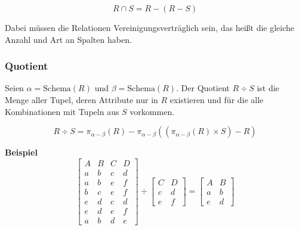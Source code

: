 \documentclass[a4paper, 11pt, accentcolor = tud3b]{tudreport}
\newcommand{\Schema}{\text{Schema}}
\begin{document}
                    \begin{equation*}
	                    R \cap S = R - (R - S)
                    \end{equation*}
                    
                    Dabei müssen die Relationen Vereinigungsverträglich sein, das heißt die gleiche Anzahl und Art an Spalten haben.

                \subsubsection{Quotient} %
                    Seien \( \alpha = \Schema(R) \) und \( \beta = \Schema(R) \). Der Quotient \( R \div S \) ist die Menge aller Tupel, deren Attribute nur in \(R\) existieren und für die alle Kombinationen mit Tupeln aus \(S\) vorkommen.
                    
                    \begin{equation*}
	                    R \div S = \pi_{\alpha - \beta}(R) - \pi_{\alpha - \beta}((\pi_{\alpha-\beta}(R) \times S) - R)
                    \end{equation*}
                    
                    \textbf{Beispiel}
                   	\begin{equation*}
                    	\begin{bmatrix}
	                    	A & B & C & D \\ \hline
	                    	a & b & c & d \\
	                    	a & b & e & f \\
	                    	b & c & e & f \\
	                    	e & d & c & d \\
	                    	e & d & e & f \\
	                    	a & b & d & e
                    	\end{bmatrix}
                    	\div
                    	\begin{bmatrix}
                    		C & D \\ \hline
                    		c & d \\
                    		e & f
                    	\end{bmatrix}
                    	=
                    	\begin{bmatrix}
	                    	A & B \\ \hline
	                    	a & b \\
	                    	e & d
                    	\end{bmatrix}
                   	\end{equation*}
\end{document}

